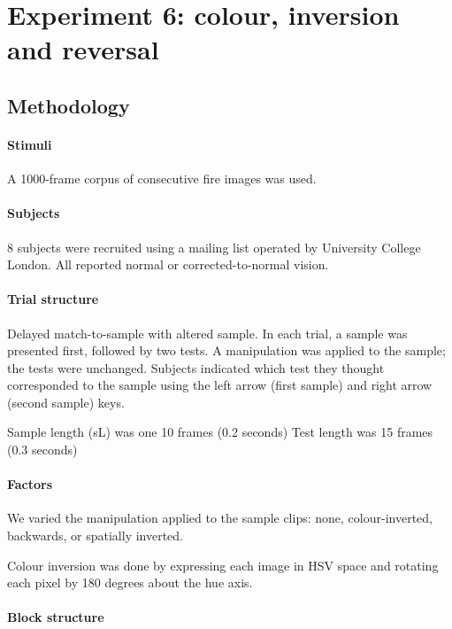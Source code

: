 \section{Experiment 6: colour, inversion and reversal}

\subsection{Methodology}

\paragraph{Stimuli}

A 1000-frame corpus of consecutive fire images was used.



\paragraph{Subjects}

8 subjects were recruited using a mailing list operated by University College London. All reported normal or corrected-to-normal vision.

\paragraph{Trial structure}

Delayed match-to-sample with altered sample.
In each trial, a sample was presented first, followed by two tests. A manipulation was applied to the sample; the tests were unchanged. Subjects indicated which test they thought corresponded to the sample using the left arrow (first sample) and right arrow (second sample) keys. 

Sample length (sL) was one 10 frames (0.2 seconds)
Test length was 15 frames (0.3 seconds)

\paragraph{Factors}

We varied the manipulation applied to the sample clips:
none, colour-inverted, backwards, or spatially inverted.

Colour inversion was done by expressing each image in HSV space and rotating each pixel by 180 degrees about the hue axis.

\paragraph{Block structure}

